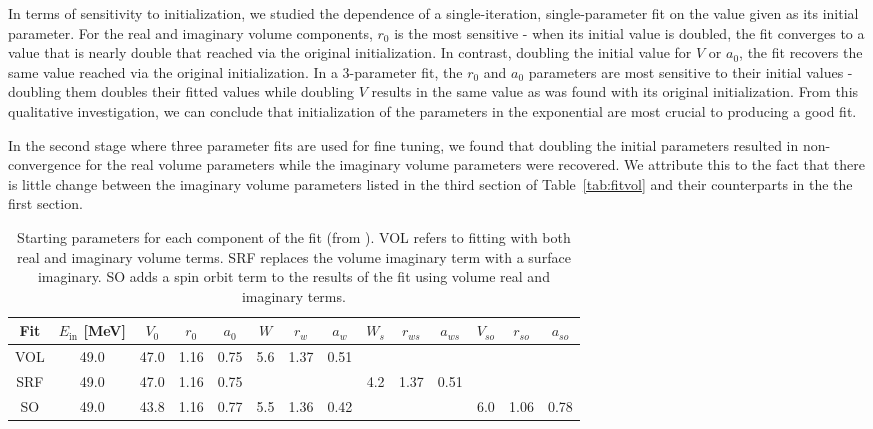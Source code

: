 \documentclass[]{scrartcl}
\begin{document}
In terms of sensitivity to initialization, we studied the dependence of a single-iteration, single-parameter fit on the value given as its initial parameter. For the real and imaginary volume components, $r_0$ is the most sensitive - when its initial value is doubled, the fit converges to a value that is nearly double that reached via the original initialization. In contrast, doubling the initial value for $V$ or $a_0$, the fit recovers the same value reached via the original initialization. In a 3-parameter fit, the $r_0$ and $a_0$ parameters are most sensitive to their initial values - doubling them doubles their fitted values while doubling $V$ results in the same value as was found with its original initialization. From this qualitative investigation, we can conclude that initialization of the parameters in the exponential are most crucial to producing a good fit.

In the second stage where three parameter fits are used for fine tuning, we found that doubling the initial parameters resulted in non-convergence for the real volume parameters while the imaginary volume parameters were recovered. We attribute this to the fact that there is little change between the imaginary volume parameters listed in the third section of Table~\ref{tab:fitvol} and their counterparts in the the first section.





\begin{table}
\centering
	\begin{tabular}{ c | c | c c c | c c c | c c c | c c c |  }
	Fit & $E _{\mathrm{in}}$ [MeV] & $ V _0$ & $ r _0$ & $ a _0$ & $W$ & $ r _{w} $ & $ a _{w} $ & $W_s$ &$ r _{ws}$ & $a_{ws}$ & $V_{so}$ & $r_{so}$ & $a_{so}$ \\
\hline
	VOL & 49.0 &  47.0 &  1.16 &  0.75  &  5.6 & 1.37 &  0.51 & & & & & & \\
	SRF & 49.0 &  47.0 &  1.16 &  0.75 & & &  &  4.2 & 1.37 &  0.51 & & & \\
\hline
	SO & 49.0 & 43.8 & 1.16 & 0.77 & 5.5 & 1.36 & 0.42 & & & & 6.0 & 1.06 & 0.78\\
\hline
	\end{tabular}
	\caption{Starting parameters for each component of the fit (from \citep{Menet1971}). VOL refers to fitting with both real and imaginary volume terms. SRF replaces the volume imaginary term with a surface imaginary. SO adds a spin orbit term to the results of the fit using volume real and imaginary terms.}
	\label{tab:init}
\end{table}
\end{document}
